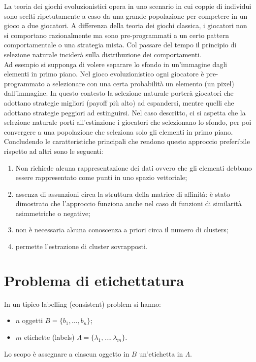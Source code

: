 	La teoria dei giochi evoluzionistici opera in uno scenario in cui coppie di individui sono scelti ripetutamente a caso da una grande popolazione per competere in un gioco a due giocatori. A differenza della teoria dei giochi classica, i giocatori non si comportano razionalmente ma sono pre-programmati a un certo pattern comportamentale o una strategia mista. Col passare del tempo il principio di selezione naturale inciderà sulla distribuzione dei comportamenti.\\

	Ad esempio si supponga di volere separare lo sfondo in un'immagine dagli elementi in primo piano. Nel gioco evoluzionistico ogni giocatore è pre-programmato a selezionare con una certa probabilità un elemento (un pixel) dall'immagine. In questo contesto la selezione naturale porterà giocatori che adottano strategie migliori (payoff più alto) ad espandersi, mentre quelli che adottano strategie peggiori ad estinguirsi. Nel caso descritto, ci si aspetta che la selezione naturale porti all'estinzione i giocatori che selezionano lo sfondo, per poi convergere a una popolazione che seleziona solo gli elementi in primo piano.\\

	Concludendo le caratteristiche principali che rendono questo approccio preferibile rispetto ad altri sono le seguenti:
	\begin{enumerate}
		\item Non richiede alcuna rappresentazione dei dati ovvero che gli elementi debbano essere rappresentato come punti in uno spazio vettoriale;
		\item assenza di assunzioni circa la struttura della matrice di affinità: è stato dimostrato che l'approccio funziona anche nel caso di funzioni di similarità asimmetriche o negative;
		\item non è necessaria alcuna conoscenza a priori circa il numero di clusters;
		\item permette l'estrazione di cluster sovrapposti.
	\end{enumerate}

	
	
	\section{Problema di etichettatura} %
	\label{sec:problema_di_etichettatura}
	In un tipico labelling (consistent) problem si hanno:
	\begin{itemize}
		\item $n$ oggetti $B= \{b_1, \dots, b_n\}$;
		\item $m$ etichette (labels) $\Lambda = \{\lambda_1, \dots, \lambda_m\}$.
	\end{itemize} 
	Lo scopo è assegnare a ciascun oggetto in $B$ un'etichetta in $\Lambda$.\\
	
